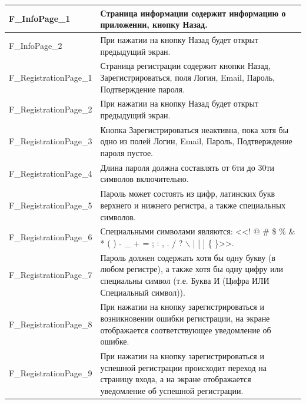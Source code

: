 \documentclass[a4paper, 14pt]{article}
\begin{document}
\begin{longtable}{| p{} | p{} |}
    F\_InfoPage\_1                  & Страница информации содержит информацию о приложении, кнопку Назад.                                                                                                                \\ \hline
    F\_InfoPage\_2                  & При нажатии на кнопку Назад будет открыт предыдущий экран.                                                                                                                         \\ \hline

    F\_RegistrationPage\_1          & Страница регистрации содержит кнопки Назад, Зарегистрироваться, поля Логин, Email, Пароль, Подтверждение пароля.                                                                   \\ \hline
    F\_RegistrationPage\_2          & При нажатии на кнопку Назад будет открыт предыдущий экран.                                                                                                                         \\ \hline
    F\_RegistrationPage\_3          & Кнопка Зарегистрироваться неактивна, пока хотя бы одно из полей Логин, Email, Пароль, Подтверждение пароля пустое.                                                                 \\ \hline
    F\_RegistrationPage\_4          & Длина пароля должна составлять от 6ти до 30ти символов включительно.                                                                                                               \\ \hline
    F\_RegistrationPage\_5          & Пароль может состоять из цифр, латинских букв верхнего и нижнего регистра, а также специальных символов.                                                                           \\ \hline
    F\_RegistrationPage\_6          & Специальными символами являются: <<! @ \# \$ \% \& * ( ) - \_ + = ; : , . / ? $\backslash$ | [ ] \{ \}>>.                                                                          \\ \hline
    F\_RegistrationPage\_7          & Пароль должен содержать хотя бы одну букву (в любом регистре), а также хотя бы одну цифру или специальны символ (т.е. Буква И (Цифра ИЛИ Специальный символ)).                     \\ \hline
    F\_RegistrationPage\_8          & При нажатии на кнопку зарегистрироваться и возникновении ошибки регистрации, на экране отображается соответствующее уведомление об ошибке.                                         \\ \hline
    F\_RegistrationPage\_9          & При нажатии на кнопку зарегистрироваться и успешной регистрации происходит переход на страницу входа, а на экране отображается уведомление об успешной регистрации.                \\ \hline


\end{longtable}
\end{document}
